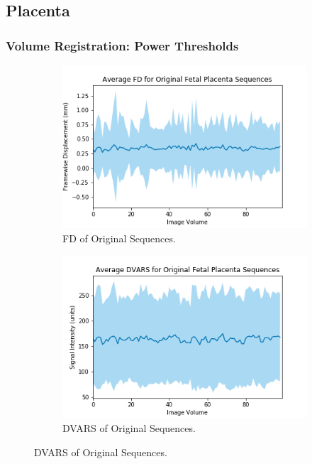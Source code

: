 \subsection{Placenta}

\subsubsection{Volume Registration: Power Thresholds}

\begin{figure}[t]
	\centering
	\begin{subfigure}{0.4\textwidth}
		\centering
		\includegraphics[width=1.0\textwidth]{6/figures/fetal-placenta-bold-fd-150.png}
		\caption{FD of Original Sequences.}
	\end{subfigure}
	\hspace{0.05\textwidth}
	\begin{subfigure}{0.4\textwidth}
		\centering
		\includegraphics[width=1.0\textwidth]{6/figures/fetal-placenta-bold-dvars-150.png}
		\caption{DVARS of Original Sequences.}
	\end{subfigure}
	

\end{figure}
